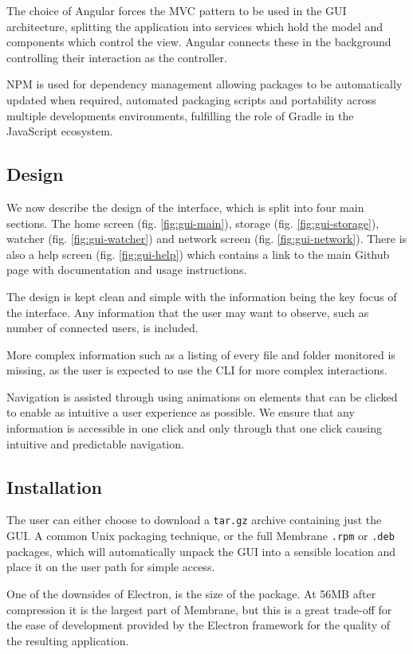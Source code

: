 \documentclass[11pt, a4paper, twocolumn, twoside]{report}
\def\code#1{\texttt{#1}}
\begin{document}
The choice of Angular forces the MVC pattern to be used in the GUI architecture, splitting the application into services which hold the model and components which control the view. Angular connects these in the background controlling their interaction as the controller.

NPM is used for dependency management allowing packages to be automatically updated when required, automated packaging scripts and portability across multiple developments environments, fulfilling the role of Gradle in the JavaScript ecosystem.

\subsection{Design}

We now describe the design of the interface, which is split into four main sections. The home screen (fig. \ref{fig:gui-main}), storage (fig. \ref{fig:gui-storage}), watcher (fig. \ref{fig:gui-watcher}) and network screen (fig. \ref{fig:gui-network}). There is also a help screen (fig. \ref{fig:gui-help}) which contains a link to the main Github page with documentation and usage instructions.

The design is kept clean and simple with the information being the key focus of the interface. Any information that the user may want to observe, such as number of connected users, is included.

More complex information such as a listing of every file and folder monitored is missing, as the user is expected to use the CLI for more complex interactions.

Navigation is assisted through using animations on elements that can be clicked to enable as intuitive a user experience as possible. We ensure that any information is accessible in one click and only through that one click causing intuitive and predictable navigation.

\subsection{Installation}

The user can either choose to download a \code{tar.gz} archive containing just the GUI. A common Unix packaging technique, or the full Membrane \code{.rpm} or \code{.deb} packages, which will automatically unpack the GUI into a sensible location and place it on the user path for simple access.

One of the downsides of Electron, is the size of the package. At 56MB after compression it is the largest part of Membrane, but this is a great trade-off for the ease of development provided by the Electron framework for the quality of the resulting application.
\end{document}
